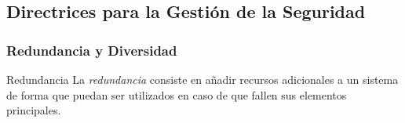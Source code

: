 \documentclass[a4paper,slidestop,xcolor=pst,dvips,blue]{beamer}
\begin{document}
%
%
%

\subsection{Directrices para la Gestión de la Seguridad}

\begin{frame}[c]
	\frametitle{Redundancia y Diversidad}
	\begin{block}{Redundancia}
		La \emph{redundancia} consiste en añadir recursos adicionales a un sistema de forma que puedan ser utilizados en caso de
		que fallen sus elementos principales.
	\end{block}
\end{frame}
\end{document}
